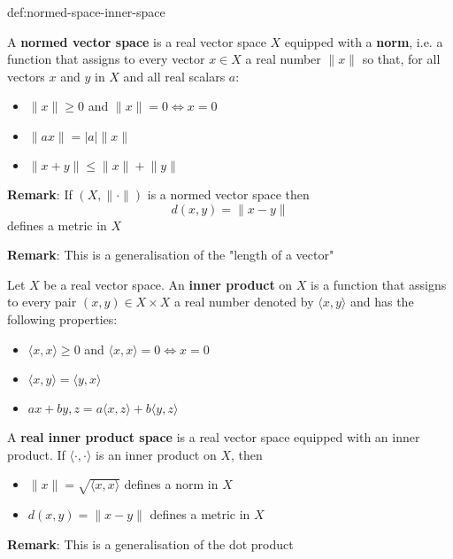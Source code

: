 \documentclass[landscape, 8pt]{extarticle}
\begin{document}
\begin{multicols}{3}
\vspace{-5pt}
\begin{dfn}{def:normed-space-inner-space}{}
    \vspace{-5pt}

    \vspace{-3pt}
    A \textbf{normed vector space} is a real vector space $X$ equipped with a \textbf{norm}, i.e. a function that assigns to every vector $x\in X$ a real number $\lVert x \rVert$ so that, for all vectors $x$ and $y$ in $X$ and all real scalars $a$:

    \vspace{-5pt}
    \begin{itemize}
        \item $\lVert x\rVert\ge 0 $ and $\lVert x \rVert = 0 \iff x = 0$
        \item $\lVert ax \rVert = \lvert a \rvert\lVert x \rVert$
        \item $\lVert x+y \rVert\le \lVert x \rVert + \lVert y \rVert$
    \end{itemize}

    \vspace{-7pt}
    \longrule{0.08ex}
    \textbf{Remark}: If $(X, \lVert \cdot \rVert)$ is a normed vector space then
    \[d(x,y) = \lVert x - y \rVert\]
    defines a metric in $X$

    \textbf{Remark}: This is a generalisation of the "length of a vector"


    \vspace{-3pt}
    Let $X$ be a real vector space. An \textbf{inner product} on $X$ is a function that assigns to every pair $(x,y)\in X \times X $ a real number denoted by $\langle x,y \rangle$ and has the following properties:
    \vspace{-3pt}
    \begin{itemize}
        \item $\langle x,x \rangle\ge 0$ and $\langle x,x \rangle = 0 \iff x = 0$
        \item $\langle x,y \rangle = \langle y,x \rangle$
        \item $ax + by, z = a\langle x,z \rangle + b\langle y,z \rangle$
    \end{itemize}

    \vspace{-5pt}
    \longrule{0.08ex}
    A \textbf{real inner product space} is a real vector space equipped with an inner product.
    If $\langle \cdot, \cdot \rangle$ is an inner product on $X$, then
    \vspace{-5pt}
    \begin{itemize}
        \item $\lVert x \rVert = \sqrt{\langle x,x \rangle}$ defines a norm in $X$
        \item $d(x,y) = \lVert x - y \rVert$ defines a metric in $X$
    \end{itemize}
    \vspace{-5pt}
    \textbf{Remark}: This is a generalisation of the dot product
\end{dfn}



\end{multicols}
\end{document}

